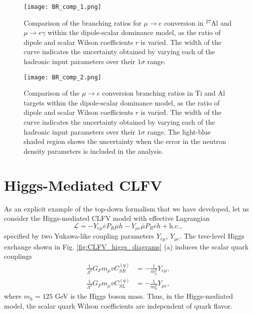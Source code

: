 \documentclass[12pt,letterpaper]{book}
\begin{document}
\begin{figure}
\centering
\texttt{[image: BR\_comp\_1.png]}
\caption{Comparison of the branching ratios for $\mu\rightarrow e$ conversion in $^{27}$Al and $\mu\rightarrow e\gamma$ within the dipole-scalar dominance model, as the ratio of dipole and scalar Wilson coefficients $r$ is varied. The width of the curve indicates the uncertainty obtained by varying each of the hadronic input parameters over their $1\sigma$ range.}
\label{fig:BR_comp_1}
\end{figure}

\begin{figure}
\centering
\texttt{[image: BR\_comp\_2.png]}
\caption{Comparison of the $\mu\rightarrow e$ conversion branching ratios in Ti and Al targets within the dipole-scalar dominance model, as the ratio of dipole and scalar Wilson coefficients $r$ is varied. The width of the curve indicates the uncertainty obtained by varying each of the hadronic input parameters over their $1\sigma$ range. The light-blue shaded region shows the uncertainty when the error in the neutron density parameters is included in the analysis.}
\label{fig:BR_comp_2}
\end{figure}


\section{Higgs-Mediated CLFV}
\label{sec:CLFV_higgs}
As an explicit example of the top-down formalism that we have developed, let us consider the Higgs-mediated CLFV model with effective Lagrangian
\begin{equation}
\mathcal{L}=-Y_{e\mu}\bar{e}P_R\mu h-Y_{\mu e}\bar{\mu}P_Reh+\mathrm{h.c.},
\label{eq:L_higgs}
\end{equation}
specified by two Yukawa-like coupling parameters $Y_{e\mu}$, $Y_{\mu e}$. The tree-level Higgs exchange shown in Fig. \ref{fig:CLFV_higgs_diagrams} (a) induces the scalar quark couplings
\begin{equation}
\begin{split}
\frac{1}{\Lambda^2}G_Fm_{\mu}vC^{(q)}_{SR}&=-\frac{1}{m_h^2}Y_{e\mu},\\
\frac{1}{\Lambda^2}G_Fm_{\mu}vC_{SL}^{(q)}&=-\frac{1}{m_h^2}Y_{\mu e},
\end{split}
\end{equation}
where $m_h=125$ GeV is the Higgs boson mass. Thus, in the Higgs-mediated model, the scalar quark Wilson coefficients are independent of quark flavor. 
\end{document}
